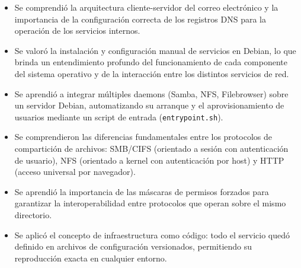 \begin{itemize}
  \item Se comprendió la arquitectura cliente-servidor del correo electrónico
        y la importancia de la configuración correcta de los registros DNS
        para la operación de los servicios internos.
  \item Se valoró la instalación y configuración manual de servicios en
        Debian, lo que brinda un entendimiento profundo del funcionamiento de
        cada componente del sistema operativo y de la interacción entre los
        distintos servicios de red.
  \item Se aprendió a integrar múltiples daemons (Samba, NFS, Filebrowser)
        sobre un servidor Debian, automatizando su arranque y el
        aprovisionamiento de usuarios mediante un script de entrada
        (\texttt{entrypoint.sh}).
  \item Se comprendieron las diferencias fundamentales entre los protocolos de
        compartición de archivos: SMB/CIFS (orientado a sesión con
        autenticación de usuario), NFS (orientado a kernel con autenticación
        por host) y HTTP (acceso universal por navegador).
  \item Se aprendió la importancia de las máscaras de permisos forzados para
        garantizar la interoperabilidad entre protocolos que operan sobre el
        mismo directorio.
  \item Se aplicó el concepto de infraestructura como código: todo el servicio
        quedó definido en archivos de configuración versionados,
        permitiendo su reproducción exacta en cualquier entorno.
\end{itemize}